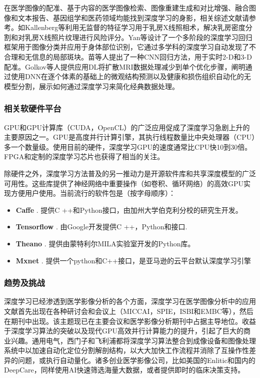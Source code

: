 在医学图像的配准、基于内容的医学图像检索、图像重建生成和对比增强、融合图像和文本报告、基因组学和医药领域均能找到深度学习的身影，相关综述文献请参考。如Kallenberg等\citep{Kallenberg2016Unsupervised}利用无监督的特征学习用于乳房X线照相术，解决乳房密度分割和对乳房X线照片纹理进行风险评分。Yan等\citep{Yan2016Multi}设计了一个多阶段的深度学习回归框架用于图像分类并应用于身体部位识别，它通过多学科的深度学习自动发现了不合理和无信息的局部斑块。苗等人\citep{Miao2016A}提出了一种CNN回归方法，用于实时2-D和3-D配准。Golkov等人\citep{Golkov2016q}提供应用DL将扩散MRI数据处理减少到单个优化步骤，阐明通过使用DNN在逐个体素的基础上的微观结构预测以及健康和损伤组织自动化的无模型分割，展示如何通过深度学习来简化经典数据处理。
\subsubsection{相关软硬件平台}
GPU和GPU计算库（CUDA，OpenCL）的广泛应用促成了深度学习急剧上升的主要原因之一。GPU是高度并行计算引擎，其执行线程数量比中央处理器（CPU）多一个数量级。使用目前的硬件，深度学习GPU的速度通常比CPU快10到30倍。FPGA和定制的深度学习芯片也获得了相当的关注。

除硬件之外，深度学习方法普及的另一推动力是开源软件库和共享深度模型的广泛可用性。这些库提供了神经网络中重要操作（如卷积、循环网络）的高效GPU实现方便用户使用。当前流行的软件包是（按字母顺序）：
\begin{itemize}
 \item {\bf Caffe} \citep{Jia2014}. 提供C ++和Python接口，由加州大学伯克利分校的研究生开发。
 \item {\bf Tensorflow} \citep{Abadi2016TensorFlow}. 由Google开发提供C ++，Python和接口.
 \item {\bf Theano} \citep{AlRfou2016Theano}. 提供由蒙特利尔MILA实验室开发的Python库。
 \item {\bf Mxnet} \citep{Chen2015mxnet}. 提供一个python和C++接口，是亚马逊的云平台默认深度学习引擎  
\end{itemize}
 
\subsubsection{趋势及挑战}

深度学习已经渗透到医学影像分析的各个方面，深度学习在医学图像分析中的应用文献首先出现在各种研讨会和会议上（MICCAI，SPIE，ISBI和EMBC等），然后在期刊中出现。该主题现已在主要会议和医学影像分析期刊中占据主导地位。收益于深度学习算法的突破以及现代GPU高效并行计算能力的提升，引起了巨大的商业兴趣。通用电气，西门子和飞利浦都将深度学习算法整合到成像设备和图像处理系统中以加速自动化定位分割解剖结构，以大大加快工作流程并消除了互操作性差异的问题，或执行自动量化。诸多创业医学影像公司，比如美国的Enlitic和国内的DeepCare，同样使用AI快速筛选海量大数据，或者提供即时的临床决策支持。


